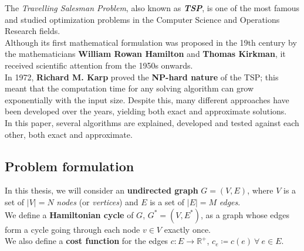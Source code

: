 
The \textit{Travelling Salesman Problem}, also known as \textit{\textbf{TSP}}, is one of the most famous and studied optimization problems in the Computer Science and Operations Research fields.\\
Although its first mathematical formulation was proposed in the 19th century by the mathematicians \textbf{William Rowan Hamilton} and \textbf{Thomas Kirkman}, it received scientific attention from the 1950s onwards.\\
In 1972, \textbf{Richard M. Karp} proved the \textbf{NP-hard nature} of the TSP; this meant that the computation time for any solving algorithm can grow exponentially with the input size. Despite this, many different approaches have been developed over the years, yielding both exact and approximate solutions.\\

In this paper, several algorithms are explained, developed and tested against each other, both exact and approximate.

{}
\subsection*{Problem formulation}\label{Problem formulation}

In this thesis, we will consider an \textbf{undirected graph} $G=(V, E)$, where $V$ is a set of $|V|=N$ \textit{nodes} (or \textit{vertices}) and $E$ is a set of $|E|=M$ \textit{edges}.\\
We define a \textbf{Hamiltonian cycle} of $G$, $G^*=(V, E^*)$, as a graph whose edges form a cycle going through each node $v\in V$ exactly once.\\
We also define a \textbf{cost function} for the edges $c : E \rightarrow \mathbb{R}^+$, $c_e\coloneq c(e) \ \forall \ e\in E$.\\

